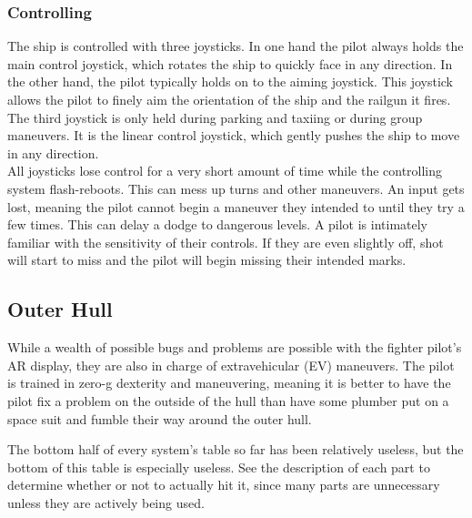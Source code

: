 \documentclass[a4paper]{article}
\begin{document}
\vspace{-0.5cm} \hspace{-18pt} \subsubsection{Controlling} \label{fighter_controlling} \vspace{-0.2cm}
The ship is controlled with three joysticks. In one hand the pilot always holds the main control joystick, which rotates the ship to quickly face in any direction. In the other hand, the pilot typically holds on to the aiming joystick. This joystick allows the pilot to finely aim the orientation of the ship and the railgun it fires. The third joystick is only held during parking and taxiing or during group maneuvers. It is the linear control joystick, which gently pushes the ship to move in any direction.
\\ \cci
{All joysticks lose control for a very short amount of time while the controlling system flash-reboots. This can mess up turns and other maneuvers.}
{An input gets lost, meaning the pilot cannot begin a maneuver they intended to until they try a few times. This can delay a dodge to dangerous levels.}
{A pilot is intimately familiar with the sensitivity of their controls. If they are even slightly off, shot will start to miss and the pilot will begin missing their intended marks.}


\subsection{Outer Hull} \label{outer}

While a wealth of possible bugs and problems are possible with the fighter pilot's AR display, they are also in charge of extravehicular (EV) maneuvers. The pilot is trained in zero-g dexterity and maneuvering, meaning it is better to have the pilot fix a problem on the outside of the hull than have some plumber put on a space suit and fumble their way around the outer hull.

The bottom half of every system's table so far has been relatively useless, but the bottom of this table is especially useless. See the description of each part to determine whether or not to actually hit it, since many parts are unnecessary unless they are actively being used.
\end{document}
